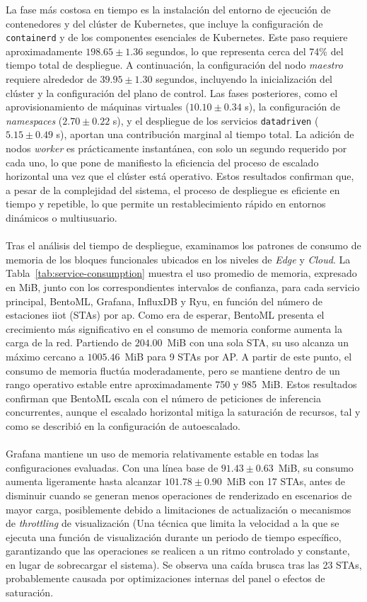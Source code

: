La fase más costosa en tiempo es la instalación del entorno de ejecución de contenedores y del clúster de Kubernetes, que incluye la configuración de \texttt{containerd} y de los componentes esenciales de Kubernetes. Este paso requiere aproximadamente $198.65 \pm 1.36$ segundos, lo que representa cerca del 74\% del tiempo total de despliegue. A continuación, la configuración del nodo \textit{maestro} requiere alrededor de $39.95 \pm 1.30$ segundos, incluyendo la inicialización del clúster y la configuración del plano de control. Las fases posteriores, como el aprovisionamiento de máquinas virtuales ($10.10 \pm 0.34$ s), la configuración de \textit{namespaces} ($2.70 \pm 0.22$ s), y el despliegue de los servicios \texttt{datadriven} ($5.15 \pm 0.49$ s), aportan una contribución marginal al tiempo total. La adición de nodos \textit{worker} es prácticamente instantánea, con solo un segundo requerido por cada uno, lo que pone de manifiesto la eficiencia del proceso de escalado horizontal una vez que el clúster está operativo. Estos resultados confirman que, a pesar de la complejidad del sistema, el proceso de despliegue es eficiente en tiempo y repetible, lo que permite un restablecimiento rápido en entornos dinámicos o multiusuario.\\
\\
Tras el análisis del tiempo de despliegue, examinamos los patrones de consumo de memoria de los bloques funcionales ubicados en los niveles de \textit{Edge} y \textit{Cloud}. La Tabla~\ref{tab:service-consumption} muestra el uso promedio de memoria, expresado en MiB, junto con los correspondientes intervalos de confianza, para cada servicio principal, BentoML, Grafana, InfluxDB y Ryu, en función del número de estaciones \gls{iiot} (STAs) por \gls{ap}. Como era de esperar, BentoML presenta el crecimiento más significativo en el consumo de memoria conforme aumenta la carga de la red. Partiendo de $204.00$~MiB con una sola STA, su uso alcanza un máximo cercano a $1005.46$~MiB para 9 STAs por AP. A partir de este punto, el consumo de memoria fluctúa moderadamente, pero se mantiene dentro de un rango operativo estable entre aproximadamente 750 y 985~MiB. Estos resultados confirman que BentoML escala con el número de peticiones de inferencia concurrentes, aunque el escalado horizontal mitiga la saturación de recursos, tal y como se describió en la configuración de autoescalado.\\
\\
Grafana mantiene un uso de memoria relativamente estable en todas las configuraciones evaluadas. Con una línea base de $91.43 \pm 0.63$~MiB, su consumo aumenta ligeramente hasta alcanzar $101.78 \pm 0.90$~MiB con 17 STAs, antes de disminuir cuando se generan menos operaciones de renderizado en escenarios de mayor carga, posiblemente debido a limitaciones de actualización o mecanismos de \textit{throttling} de visualización (Una técnica que limita la velocidad a la que se ejecuta una función de visualización durante un periodo de tiempo específico, garantizando que las operaciones se realicen a un ritmo controlado y constante, en lugar de sobrecargar el sistema). Se observa una caída brusca tras las 23 STAs, probablemente causada por optimizaciones internas del panel o efectos de saturación.\\

